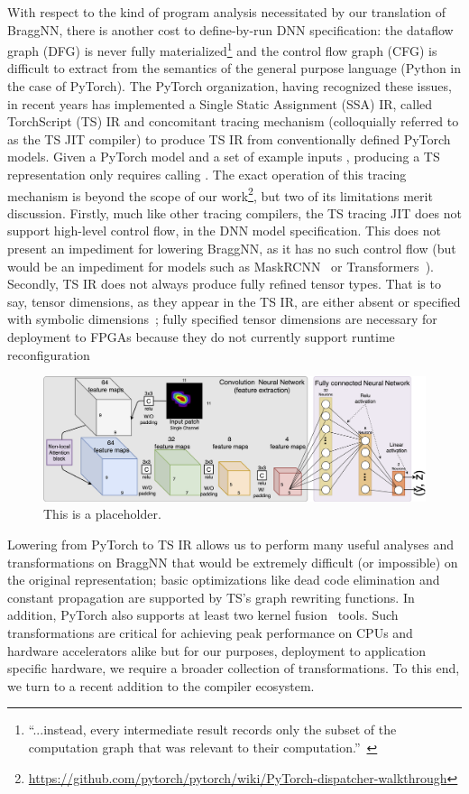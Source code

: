 With respect to the kind of program analysis necessitated by our translation of BraggNN, there is another cost to define-by-run DNN specification: the dataflow graph (DFG) is never fully materialized\footnote{``...instead, every intermediate result records only the subset of the computation graph that was relevant to their computation.''~\cite{paszke2017automatic}} and the control flow graph (CFG) is difficult to extract from the semantics of the general purpose language (Python in the case of PyTorch).
The PyTorch organization, having recognized these issues, in recent years has implemented a Single Static Assignment (SSA) IR, called TorchScript (TS) IR and concomitant tracing mechanism (colloquially referred to as the TS JIT compiler) to produce TS IR from conventionally defined PyTorch models.
Given a PyTorch model  and a set of example inputs , producing a TS representation only requires calling .
The exact operation of this tracing mechanism is beyond the scope of our work\footnote{\url{https://github.com/pytorch/pytorch/wiki/PyTorch-dispatcher-walkthrough}}, but two of its limitations merit discussion.
Firstly, much like other tracing compilers, the TS tracing JIT does not support high-level control flow, in the DNN model specification.
This does not present an impediment for lowering BraggNN, as it has no such control flow (but would be an impediment for models such as MaskRCNN~\cite{8237584} or Transformers~\cite{radford2019language}).
Secondly, TS IR does not always produce fully refined tensor types.
That is to say, tensor dimensions, as they appear in the TS IR, are either absent or specified with symbolic dimensions~\cite{10.1145/3211346.3211348}; fully specified tensor dimensions are necessary for deployment to FPGAs because they do not currently support runtime reconfiguration~\cite{reconfigfpga}

\begin{figure}
	\includegraphics[width=\textwidth]{figures/BraggNN}
	\caption{This is a placeholder.}
\end{figure}
Lowering from PyTorch to TS IR allows us to perform many useful analyses and transformations on BraggNN that would be extremely difficult (or impossible) on the original representation;
basic optimizations like dead code elimination and constant propagation are supported by TS's graph rewriting functions.
In addition, PyTorch also supports at least two kernel fusion~\cite{10.1145/2688500.2688521} tools.
Such transformations are critical for achieving peak performance on CPUs and hardware accelerators alike but for our purposes, deployment to application specific hardware, we require a broader collection of transformations.
To this end, we turn to a recent addition to the compiler ecosystem.

